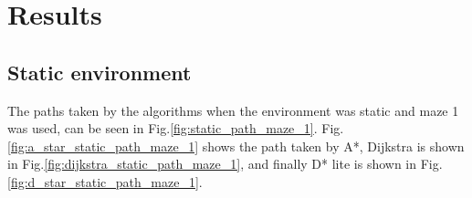 \section{Results}





\subsection{Static environment}


The paths taken by the algorithms when the environment was static and maze 1 was used, can be seen in Fig.\:\ref{fig:static_path_maze_1}. Fig.\:\ref{fig:a_star_static_path_maze_1} shows the path taken by A*, Dijkstra is shown in Fig.\:\ref{fig:dijkstra_static_path_maze_1}, and finally D* lite is shown in Fig.\:\ref{fig:d_star_static_path_maze_1}.

